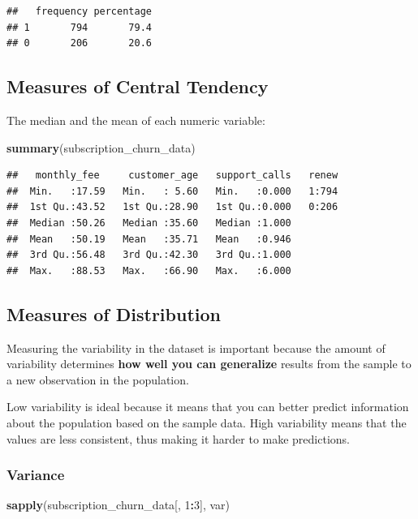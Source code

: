 \documentclass[
]{article}
\newenvironment{Shaded}{\begin{snugshade}}{\end{snugshade}}
\newcommand{\DecValTok}[1]{\textcolor[rgb]{0.00,0.00,0.81}{#1}}
\newcommand{\FunctionTok}[1]{\textcolor[rgb]{0.13,0.29,0.53}{\textbf{#1}}}
\newcommand{\NormalTok}[1]{#1}
\newcommand{\SpecialCharTok}[1]{\textcolor[rgb]{0.81,0.36,0.00}{\textbf{#1}}}
\begin{document}
\begin{verbatim}
##   frequency percentage
## 1       794       79.4
## 0       206       20.6
\end{verbatim}

\subsection{Measures of Central
Tendency}\label{measures-of-central-tendency}

The median and the mean of each numeric variable:

\begin{Shaded}
\begin{Highlighting}[]
\FunctionTok{summary}\NormalTok{(subscription\_churn\_data)}
\end{Highlighting}
\end{Shaded}

\begin{verbatim}
##   monthly_fee     customer_age   support_calls   renew  
##  Min.   :17.59   Min.   : 5.60   Min.   :0.000   1:794  
##  1st Qu.:43.52   1st Qu.:28.90   1st Qu.:0.000   0:206  
##  Median :50.26   Median :35.60   Median :1.000          
##  Mean   :50.19   Mean   :35.71   Mean   :0.946          
##  3rd Qu.:56.48   3rd Qu.:42.30   3rd Qu.:1.000          
##  Max.   :88.53   Max.   :66.90   Max.   :6.000
\end{verbatim}

\subsection{Measures of Distribution}\label{measures-of-distribution}

Measuring the variability in the dataset is important because the amount
of variability determines \textbf{how well you can generalize} results
from the sample to a new observation in the population.

Low variability is ideal because it means that you can better predict
information about the population based on the sample data. High
variability means that the values are less consistent, thus making it
harder to make predictions.

\subsubsection{Variance}\label{variance}

\begin{Shaded}
\begin{Highlighting}[]
\FunctionTok{sapply}\NormalTok{(subscription\_churn\_data[, }\DecValTok{1}\SpecialCharTok{:}\DecValTok{3}\NormalTok{], var)}
\end{Highlighting}
\end{Shaded}
\end{document}

